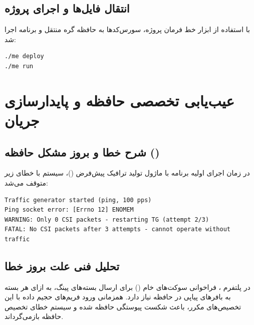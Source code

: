 \documentclass[12pt,a4paper]{article}
\begin{document}
\subsection{انتقال فایل‌ها و اجرای پروژه}
با استفاده از ابزار خط فرمان پروژه، سورس‌کدها به حافظه گره منتقل و برنامه اجرا شد:

\begin{latin}
\begin{lstlisting}[language=bash]
./me deploy
./me run
\end{lstlisting}
\EndAccSupp{}
\end{latin}

\section{عیب‌یابی تخصصی حافظه و پایدارسازی جریان }

\subsection{شرح خطا و بروز مشکل حافظه ()}
در زمان اجرای اولیه برنامه با ماژول تولید ترافیک پیش‌فرض ()، سیستم با خطای زیر متوقف می‌شد:

\begin{latin}
\begin{lstlisting}
Traffic generator started (ping, 100 pps)
Ping socket error: [Errno 12] ENOMEM
WARNING: Only 0 CSI packets - restarting TG (attempt 2/3)
FATAL: No CSI packets after 3 attempts - cannot operate without traffic
\end{lstlisting}
\EndAccSupp{}
\end{latin}

\subsection{تحلیل فنی علت بروز خطا}
در پلتفرم ، فراخوانی سوکت‌های خام () برای ارسال بسته‌های پینگ، به ازای هر بسته به بافرهای پیاپی در حافظه  نیاز دارد. همزمانی ورود فریم‌های حجیم داده  با این تخصیص‌های مکرر، باعث شکست پیوستگی حافظه شده و سیستم خطای تخصیص حافظه بازمی‌گرداند.
\end{document}
